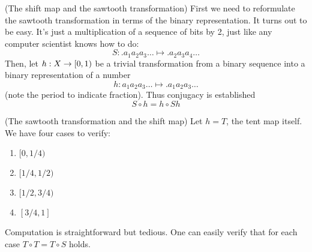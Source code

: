 \documentclass[12pt]{book}
\begin{document}
\begin{proposition}
  (The shift map and the sawtooth transformation)
  First we need to reformulate the sawtooth transformation in terms of the binary representation.
  It turns out to be easy. It's just a multiplication of a sequence of bits by 2, just like any computer scientist knows how to do:
  \begin{equation*}
    S: .a_1a_2a_3\ldots \mapsto .a_2a_3a_4\ldots
  \end{equation*}
  Then, let $h: X \rightarrow [0,1)$ be a trivial transformation from a binary sequence into a binary representation of a number
    \begin{equation*}
      h: a_1a_2a_3\ldots \mapsto .a_1a_2a_3\ldots
    \end{equation*}
    (note the period to indicate fraction).
  Thus conjugacy is established
  \begin{equation*}
    S \circ h = h \circ Sh
  \end{equation*}
  \end{proposition}

  \begin{proposition}
    (The sawtooth transformation and the shift map)
    Let $h = T$, the tent map itself. We have four cases to verify:
    \begin{enumerate}[$(i)$]
      \item $[0,1/4)$
      \item $[1/4, 1/2)$
      \item $[1/2, 3/4)$
      \item $[3/4, 1]$
    \end{enumerate}
    Computation is straightforward but tedious. One can easily verify that
    for each case $T\circ T = T\circ S$ holds.
  \end{proposition}



\end{document}
